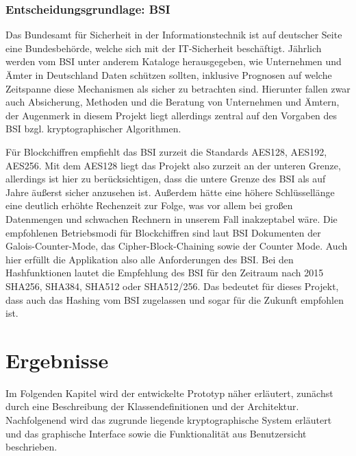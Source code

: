 \documentclass[13pt,a4paper,bibliography=totocnumbered,listof=totocnumbered]{scrartcl}
\begin{document}
\subsubsection{Entscheidungsgrundlage: BSI}
Das Bundesamt für Sicherheit in der Informationstechnik ist auf deutscher Seite eine Bundesbehörde, welche sich mit der IT-Sicherheit beschäftigt. Jährlich werden vom BSI unter anderem Kataloge herausgegeben, wie Unternehmen und Ämter in Deutschland Daten schützen sollten, inklusive Prognosen auf welche Zeitspanne diese Mechanismen als sicher zu betrachten sind. Hierunter fallen zwar auch Absicherung, Methoden und die  Beratung von Unternehmen und Ämtern, der Augenmerk in diesem Projekt liegt allerdings zentral auf den Vorgaben des BSI bzgl. kryptographischer Algorithmen.

Für Blockchiffren empfiehlt das BSI zurzeit die Standards AES128, AES192, AES256. Mit dem AES128 liegt das Projekt also zurzeit an der unteren Grenze, allerdings ist hier zu berücksichtigen, dass die untere Grenze des BSI als auf Jahre äußerst sicher anzusehen ist. Außerdem hätte eine höhere Schlüssellänge eine deutlich erhöhte Rechenzeit zur Folge, was vor allem bei großen Datenmengen und schwachen Rechnern in unserem Fall inakzeptabel wäre. Die empfohlenen Betriebsmodi für Blockchiffren sind laut BSI Dokumenten der Galois-Counter-Mode, das Cipher-Block-Chaining sowie der Counter Mode. Auch hier erfüllt die Applikation also alle Anforderungen des BSI. Bei den Hashfunktionen lautet die Empfehlung des BSI für den Zeitraum nach 2015 SHA256, SHA384, SHA512 oder SHA512/256. Das bedeutet für dieses Projekt, dass auch das Hashing vom BSI zugelassen und sogar für die Zukunft empfohlen ist.\\
 \cite{12}\cite{13}

\pagebreak


\section{Ergebnisse}\label{ErgebnisseV}
Im Folgenden Kapitel wird der entwickelte Prototyp näher erläutert, zunächst durch eine Beschreibung der Klassendefinitionen und der Architektur. Nachfolgenend wird das zugrunde liegende kryptographische System erläutert und das graphische Interface sowie die Funktionalität aus Benutzersicht beschrieben.
\end{document}
